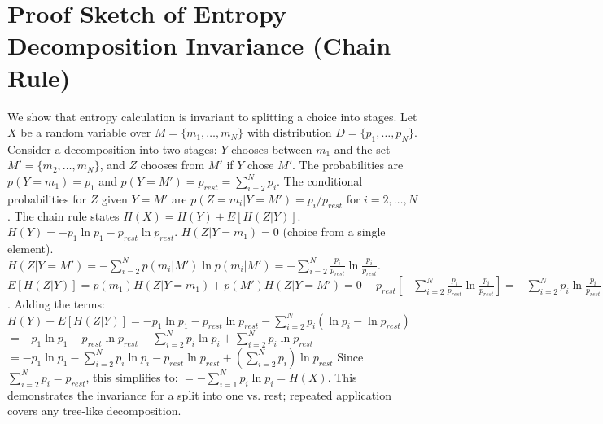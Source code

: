 \documentclass{article}
\begin{document}
\section{Proof Sketch of Entropy Decomposition Invariance (Chain Rule)} \label{app:decomp_proof}
We show that entropy calculation is invariant to splitting a choice into stages. Let $X$ be a random variable over $M = \{m_1, \dots, m_N\}$ with distribution $D=\{p_1, \dots, p_N\}$. Consider a decomposition into two stages: $Y$ chooses between $m_1$ and the set $M' = \{m_2, \dots, m_N\}$, and $Z$ chooses from $M'$ if $Y$ chose $M'$.
The probabilities are $p(Y=m_1) = p_1$ and $p(Y=M') = p_{rest} = \sum_{i=2}^N p_i$.
The conditional probabilities for $Z$ given $Y=M'$ are $p(Z=m_i|Y=M') = p_i / p_{rest}$ for $i=2, \dots, N$.
The chain rule states $H(X) = H(Y) + E[H(Z|Y)]$.
$H(Y) = -p_1 \ln p_1 - p_{rest} \ln p_{rest}$.
$H(Z|Y=m_1) = 0$ (choice from a single element).
$H(Z|Y=M') = - \sum_{i=2}^N p(m_i|M') \ln p(m_i|M') = - \sum_{i=2}^N \frac{p_i}{p_{rest}} \ln \frac{p_i}{p_{rest}}$.
$E[H(Z|Y)] = p(m_1) H(Z|Y=m_1) + p(M') H(Z|Y=M') = 0 + p_{rest} \left[ - \sum_{i=2}^N \frac{p_i}{p_{rest}} \ln \frac{p_i}{p_{rest}} \right] = - \sum_{i=2}^N p_i \ln \frac{p_i}{p_{rest}}$.
Adding the terms:
$H(Y) + E[H(Z|Y)] = -p_1 \ln p_1 - p_{rest} \ln p_{rest} - \sum_{i=2}^N p_i (\ln p_i - \ln p_{rest})$
$= -p_1 \ln p_1 - p_{rest} \ln p_{rest} - \sum_{i=2}^N p_i \ln p_i + \sum_{i=2}^N p_i \ln p_{rest}$
$= -p_1 \ln p_1 - \sum_{i=2}^N p_i \ln p_i - p_{rest} \ln p_{rest} + (\sum_{i=2}^N p_i) \ln p_{rest}$
Since $\sum_{i=2}^N p_i = p_{rest}$, this simplifies to:
$= - \sum_{i=1}^N p_i \ln p_i = H(X)$.
This demonstrates the invariance for a split into one vs. rest; repeated application covers any tree-like decomposition.
\end{document}
